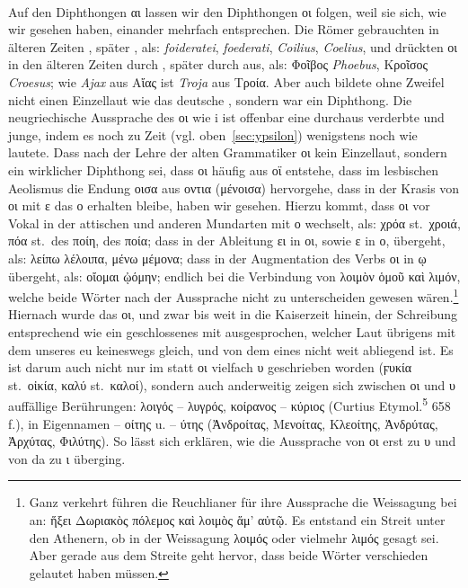 \paragraph{} Auf den Diphthongen αι lassen wir den Diphthongen οι folgen, weil sie sich, wie
wir 
gesehen haben, einander mehrfach entsprechen. Die Römer gebrauchten in
älteren Zeiten , später , als: \emph{foideratei},
\emph{foederati}, \emph{Coilius}, \emph{Coelius}, und
drückten οι in den älteren Zeiten durch , später durch  aus, als: Φοῖβος
\emph{Phoebus}, Κροῖσος \emph{Croesus}; wie \emph{Ajax} aus Αἴας ist \emph{Troja} aus Τροία.
Aber auch  bildete ohne Zweifel nicht einen Einzellaut wie das deutsche
, sondern war ein
Diphthong.
Die neugriechische Aussprache des οι wie i ist offenbar eine durchaus
verderbte und junge, indem es noch zu  Zeit (vgl.
oben~\ref{sec:ypsilon}) wenigstens noch
wie  lautete.
Dass nach der Lehre der alten Grammatiker οι kein Einzellaut,
sondern ein wirklicher Diphthong sei, dass οι häufig aus οϊ entstehe, dass im
lesbischen Aeolismus die Endung οισα aus οντια (μένοισα) hervorgehe, dass in der
Krasis von οι mit ε das ο erhalten bleibe, haben wir
 gesehen.
Hierzu kommt, dass οι vor Vokal in der attischen und anderen Mundarten mit ο
wechselt, als:
 χρόα st.\ χροιά, πόα st.\ des  ποίη, des
 ποία; dass in der Ableitung
ει in οι, sowie ε in ο, übergeht, als: λείπω λέλοιπα, μένω μέμονα; dass in der
Augmentation des Verbs οι in ῳ übergeht, als: οἴομαι ᾠόμην; endlich bei
 die Verbindung von λοιμὸν ὁμοῦ καὶ λιμόν, welche beide Wörter nach der
 Aussprache nicht zu unterscheiden gewesen
wären.\footnote{%
	Ganz verkehrt führen die Reuchlianer für ihre Aussprache die Weissagung bei
	 an: ἥξει Δωριακὸς πόλεμος καὶ λοιμὸς ἅμ' αὐτῷ. Es entstand
	ein Streit unter den Athenern, ob in der Weissagung λοιμός oder vielmehr λιμός
	gesagt sei. Aber gerade aus dem Streite geht hervor, dass beide Wörter
	verschieden gelautet haben müssen.
}
Hiernach
wurde das οι, und zwar bis weit in die Kaiserzeit hinein, der Schreibung
entsprechend wie ein geschlossenes  mit  ausgesprochen, welcher
Laut übrigens
mit dem unseres eu keineswegs gleich, und von dem eines  nicht weit abliegend
ist.
Es ist darum auch nicht nur im  statt οι vielfach υ geschrieben
worden (ϝυκία st.\ οἰκία, καλύ st.\ καλοί), sondern auch anderweitig zeigen sich
zwischen οι und υ auffällige Berührungen: λοιγός -- λυγρός, κοίρανος -- κύριος
(Curtius Etymol.\textsuperscript{5} 658 f.), in Eigennamen -- οίτης u. -- ύτης
(Ἀνδροίτας, Μενοίτας, Κλεοίτης, Ἀνδρύτας, Ἀρχύτας, Φιλύτης).
So lässt sich erklären, wie die Aussprache von οι erst zu υ und von da zu ι
überging.

